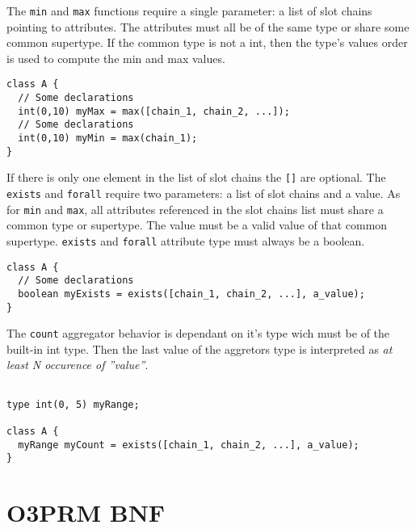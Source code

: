 \documentclass[singlespacing,12pt,a4paper]{article}
\begin{document}
The \verb+min+ and \verb+max+ functions require a single parameter: a list of
slot chains pointing to attributes. The attributes must all be of the same
type or share some common supertype. If the common type is not a int, then the
type's values order is used to compute the min and max values.

\begin{footnotesize}
\begin{verbatim}
class A {
  // Some declarations
  int(0,10) myMax = max([chain_1, chain_2, ...]);
  // Some declarations
  int(0,10) myMin = max(chain_1);
}
\end{verbatim}
\end{footnotesize}

If there is only one element in the list of slot chains the \verb+[]+ are
optional. The \verb+exists+ and \verb+forall+ require two parameters: a list
of slot chains and a value. As for \verb+min+ and \verb+max+, all attributes
referenced in the slot chains list must share a common type or supertype. The
value must be a valid value of that common supertype. \verb+exists+ and
\verb+forall+ attribute type must always be a boolean.

\begin{footnotesize}
\begin{verbatim}
class A {
  // Some declarations
  boolean myExists = exists([chain_1, chain_2, ...], a_value);
}
\end{verbatim}
\end{footnotesize}

The \verb+count+ aggregator behavior is dependant on it's type wich must be of
the built-in int type. Then the last value of the aggretors type is interpreted
as \emph{at least N occurence of ''value''}.

\begin{footnotesize}
\begin{verbatim}

type int(0, 5) myRange;

class A {
  myRange myCount = exists([chain_1, chain_2, ...], a_value);
}
\end{verbatim}
\end{footnotesize}

\newpage
\section{O3PRM BNF}
\end{document}

